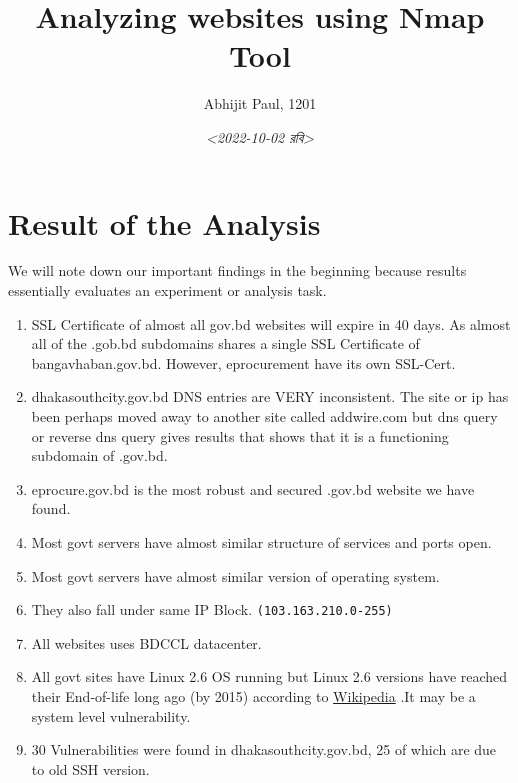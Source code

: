 \documentclass[11pt]{article}
\author{Abhijit Paul, 1201}
\date{\textit{<2022-10-02 রবি>}}
\title{Analyzing websites using Nmap Tool}
\begin{document}
\maketitle
\clearpage \tableofcontents \clearpage

\section{Result of the Analysis}
\label{sec:orgfe929b3}
We will note down our important findings in the beginning because results essentially evaluates an experiment or analysis task.\\
\begin{enumerate}
\item SSL Certificate of almost all gov.bd websites will expire in 40 days. As almost all of the .gob.bd subdomains shares a single SSL Certificate of bangavhaban.gov.bd. However, eprocurement have its own SSL-Cert.\\
\item dhakasouthcity.gov.bd DNS entries are VERY inconsistent. The site or ip has been perhaps moved away to another site called addwire.com but dns query or reverse dns query gives results that shows that it is a functioning subdomain of .gov.bd.\\
\item eprocure.gov.bd is the most robust and secured .gov.bd website we have found.\\
\item Most govt servers have almost similar structure of services and ports open.\\
\item Most govt servers have almost similar version of operating system.\\
\item They also fall under same IP Block. \texttt{(103.163.210.0-255)}\\
\item All websites uses BDCCL datacenter.\\
\item All govt sites have Linux 2.6 OS running but Linux 2.6 versions have reached their End-of-life long ago (by 2015) according to \href{https://en.wikipedia.org/wiki/Linux\_kernel\_version\_history}{Wikipedia} .It may be a system level vulnerability.\\
\item 30 Vulnerabilities were found in dhakasouthcity.gov.bd, 25 of which are due to old SSH version.\\
\end{enumerate}
\end{document}
